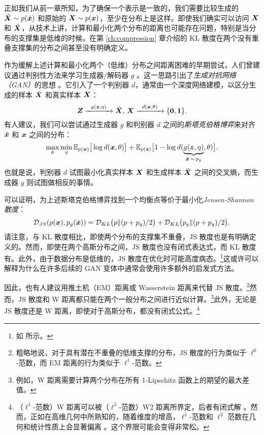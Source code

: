 \documentclass[../../book-main.tex]{subfiles}
\begin{document}
正如我们从前一章所知，为了确保一个表示是一致的，我们需要比较生成的 $\hat {\bm{X}} \sim p(\hat{\bm{x}})$ 和原始的 $\bm{X} \sim p(\bm{x})$，至少在分布上是这样。即使我们确实可以访问 $\bm{X}$ 和 $\hat {\bm{X}}$，从技术上讲，计算和最小化两个分布的距离也可能存在问题，特别是当分布的支撑集是低维的时候。在第 \ref{ch:compression} 章介绍的 KL 散度在两个没有重叠支撑集的分布之间甚至没有明确定义。

作为缓解上述计算和最小化两个（低维）分布之间距离困难的早期尝试，人们曾建议通过判别性方法来学习生成器/解码器 $g$ \cite{Tu-2007}。这一思路引出了{\em 生成对抗网络（GAN）}的思想 \cite{goodfellow2014generative}。它引入了一个判别器 $d$，通常由一个深度网络建模，以区分生成的样本 $\hat {\bm{X}}$ 和真实样本 $\bm{X}$：
\begin{equation}
 \bm{Z} \xrightarrow{\hspace{2mm} g(\bm{z},\eta) \hspace{2mm}} \hat {\bm{X}}, \, \bm{X} \xrightarrow{\hspace{2mm} d(\bm{x}, \theta)\hspace{2mm}} \{\mathbf 0, \mathbf 1\}.
 \label{eqn:GAN}
\end{equation}
有人建议，我们可以尝试通过生成器 $g$ 和判别器 $d$ 之间的{\em 斯塔克伯格博弈}来对齐 $\hat {\bm{x}}$ 和 $\bm{x}$ 之间的分布：
\begin{equation}
\max_{\theta}\min_{\eta} \mathbb{E}_{p({\bm{x}})}\big[\log d(\bm{x},\theta)\big] + \mathbb{E}_{p({\bm{z}})}\big[1 - \log d(\underbrace{g(\bm{z},\eta)}_{\hat {\bm{x}} \,\sim\, p_g},\theta)\big].
\end{equation}
也就是说，判别器 $d$ 试图最小化真实样本 $\bm{X}$ 和生成样本 $\hat {\bm{X}}$ 之间的交叉熵，而生成器 $g$ 则试图做相反的事情。

可以证明，为上述斯塔克伯格博弈找到一个均衡点等价于最小化{\em Jensen-Shannon 散度}：
\begin{equation}
    \mathcal{D}_{JS}(p(\bm{x}), p_g(\hat {\bm{x}})) = \mathcal{D}_{KL}\big(p \| (p + p_g)/{2}\big) + \mathcal{D}_{KL}\big(p_g \| (p + p_g)/{2}\big).
\end{equation}
请注意，与 KL 散度相比，即使两个分布的支撑集不重叠，JS 散度也是有明确定义的。然而，即使在两个高斯分布之间，JS 散度也没有闭式表达式，而 KL 散度有。此外，由于数据分布是低维的，JS 散度在优化时可能高度病态。\footnote{如 \cite{arjovsky2017wasserstein} 所示。}这或许可以解释为什么在许多后续的 GAN 变体中通常会使用许多额外的启发式方法。

因此，也有人建议用推土机（EM）距离或 Wasserstein 距离来代替 JS 散度。\footnote{粗略地说，对于具有潜在不重叠的低维支撑的分布，JS 散度的行为类似于 $\ell^0$-范数，而 EM 距离的行为类似于 $\ell^1$-范数。}然而，JS 散度和 W 距离都只能在两个一般分布之间进行近似计算。\footnote{例如，W 距离需要计算两个分布在所有 1-Lipschitz 函数上的期望的最大差值。}此外，无论是 JS 散度还是 W 距离，即使对于高斯分布，都没有闭式公式。\footnote{（$\ell^1$-范数）W 距离可以被（$\ell^2$-范数）W2 距离所界定，后者有闭式解 \cite{salmona2021gromovwasserstein}。然而，正如在高维几何中所熟知的，随着维度的增高，$\ell^1$-范数和 $\ell^2$ 范数在几何和统计性质上会显著偏离 \cite{Wright-Ma-2021}。这个界限可能会变得非常松。}
\end{document}
